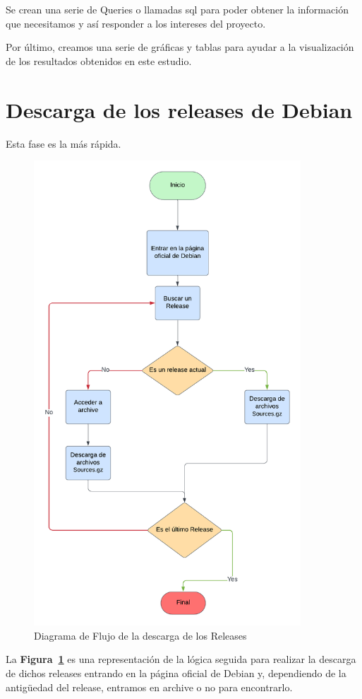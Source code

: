 \documentclass[a4paper, 12pt]{book}
\begin{document}
Se crean una serie de Queries o llamadas sql para poder obtener la información que necesitamos y así responder a los intereses del proyecto.

Por último, creamos una serie de gráficas y tablas para ayudar a la visualización de los resultados obtenidos en este estudio.


\section{Descarga de los releases de Debian} 
\label{sec:Descarga_de_los_releases_de_Debian}

Esta fase es la más rápida. 
\begin{figure}
	\centering
	\includegraphics[width=10cm, keepaspectratio]{img/Descarga Releases.png}
	\caption{Diagrama de Flujo de la descarga de los Releases}
	\label{fig:flow_descarga}
\end{figure}

La \textbf{Figura~\ref{fig:flow_descarga}} es una representación de la lógica seguida para realizar la descarga de dichos releases entrando en la página oficial de Debian y, dependiendo de la antigüedad del release, entramos en archive o no para encontrarlo.
\end{document}
